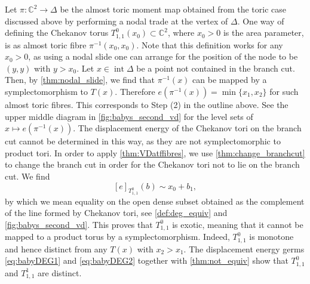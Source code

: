 \documentclass[12pt,a4paper,abstract=true,draft]{scrartcl}
\DeclareMathOperator{\interior}{int}
\begin{document}
Let $\pi \colon \mathbb{C}^2 \rightarrow \Delta$ be the almost toric moment map obtained from the toric case discussed above by performing a nodal trade at the vertex of $\Delta$.
One way of defining the Chekanov torus $T^0_{1,1}(x_0) \subset \mathbb{C}^2$, where $x_0 > 0$ is the area parameter, is as almost toric fibre $\pi^{-1}(x_0,x_0)$.
Note that this definition works for any $x_0 >0$, as using a nodal slide one can arrange for the position of the node to be $(y,y)$ with $y > x_0$.
Let $x \in \interior\Delta$ be a point not contained in the branch cut.
Then, by \cref{thm:nodal_slide}, we find that $\pi^{-1}(x)$ can be mapped by a symplectomorphism to $T(x)$.
Therefore $e(\pi^{-1}(x)) = \min \{x_1,x_2\}$ for such almost toric fibres.
This corresponds to Step (2) in the outline above.
See the upper middle diagram in \cref{fig:babys_second_vd} for the level sets of $x \mapsto e(\pi^{-1}(x))$.
The displacement energy of the Chekanov tori on the branch cut cannot be determined in this way, as they are not symplectomorphic to product tori.
In order to apply \cref{thm:VDatffibres}, we use \cref{thm:change_branchcut} to change the branch cut in order for the Chekanov tori not to lie on the branch cut.
We find
\begin{equation}
    \label{eq:babyDEG2}
    [e]_{T^0_{1,1}}(b) \sim x_0 + b_1,
\end{equation}
by which we mean equality on the open dense subset obtained as the complement of the line formed by Chekanov tori, see \cref{def:deg_equiv} and \cref{fig:babys_second_vd}.
This proves that $T^0_{1,1}$ is exotic, meaning that it cannot be mapped to a product torus by a symplectomorphism.
Indeed, $T^0_{1,1}$ is monotone and hence distinct from any $T(x)$ with $x_2 > x_1$.
The displacement energy germs \eqref{eq:babyDEG1} and \eqref{eq:babyDEG2} together with \cref{thm:not_equiv} show that $T^0_{1,1}$ and $T^1_{1,1}$ are distinct. 
\end{document}
